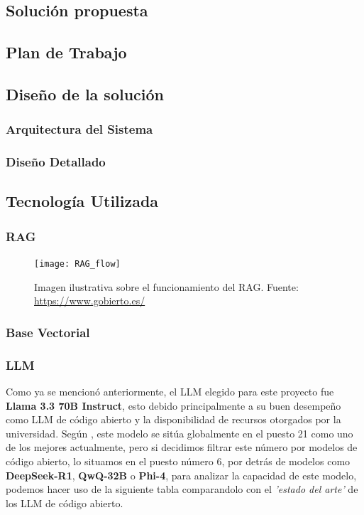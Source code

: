 \documentclass{article}
\begin{document}
\subsection{Solución propuesta}
\subsection{Plan de Trabajo}
\subsection{Diseño de la solución}
\subsubsection{Arquitectura del Sistema}
\subsubsection{Diseño Detallado}
\subsection{Tecnología Utilizada}

\subsubsection{RAG}

\begin{figure}[h!]
\centering
\texttt{[image: RAG\_flow]}
\caption{Imagen ilustrativa sobre el funcionamiento del RAG. Fuente: \url{https://www.gobierto.es/}}
\label{fig:RAG_flow}
\end{figure}

\subsubsection{Base Vectorial} 
\subsubsection{LLM} \label{LLM}
Como ya se mencionó anteriormente, el LLM elegido para este proyecto fue \textbf{Llama 3.3 70B Instruct}, esto debido principalmente a su buen desempeño como LLM de código abierto y la disponibilidad de recursos otorgados por la universidad. 
Según \cite{llm-stats}, este modelo se sitúa globalmente en el puesto 21 como uno de los mejores actualmente, pero si decidimos filtrar este número por modelos de código abierto, lo situamos en el puesto número 6, por detrás de modelos como \textbf{DeepSeek-R1}, \textbf{QwQ-32B} o \textbf{Phi-4}, para analizar la capacidad de este modelo, podemos hacer uso de la siguiente tabla comparandolo con el \textit{'estado del arte'} de los LLM de código abierto. 
\end{document}
